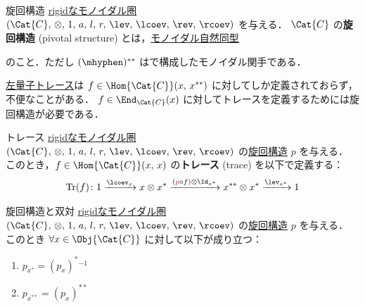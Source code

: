 \documentclass[TQFT_main]{subfiles}
\begin{document}
\begin{mydef}[label=def:pivotal,breakable]{旋回構造}
    \hyperref[redef:rigid]{rigidなモノイダル圏} $(\Cat{C},\, \otimes,\, 1,\, a,\, l,\, r,\, \lev,\, \lcoev,\, \rev,\, \rcoev)$ を与える．
    $\Cat{C}$ の\textbf{旋回構造} (pivotal structure) とは，\hyperref[def:monoidal-nat]{モノイダル自然同型}
    \begin{center}
    \end{center}
    のこと．ただし $(\mhyphen)^{**}$ はで構成したモノイダル関手である．
\end{mydef}

\hyperref[def:qtrace]{左量子トレース}は $f \in \Hom{\Cat{C}}(x,\, x^{**})$ に対してしか定義されておらず，不便なことがある．
$f \in \End_{\Cat{C}} (x)$ に対してトレースを定義するためには旋回構造が必要である．

\begin{mydef}[label=def:trace]{トレース}
    \hyperref[redef:rigid]{rigidなモノイダル圏} $(\Cat{C},\, \otimes,\, 1,\, a,\, l,\, r,\, \lev,\, \lcoev,\, \rev,\, \rcoev)$ の\hyperref[def:pivotal]{旋回構造} $p$ を与える．
    このとき，$f \in \Hom{\Cat{C}}(x,\, x)$ の\textbf{トレース} (trace) を以下で定義する：
    \begin{align}
        \Tr (f) \colon 1 \xrightarrow{\lcoev_x} x \otimes x^* \xrightarrow{(\textcolor{red}{p}\circ f) \otimes \Id_{x^*}} x^{**} \otimes x^* \xrightarrow{\lev_{x^*}} 1
    \end{align}
\end{mydef}

\begin{mylem}[label=lem:pivotal]{旋回構造と双対}
    \hyperref[redef:rigid]{rigidなモノイダル圏} $(\Cat{C},\, \otimes,\, 1,\, a,\, l,\, r,\, \lev,\, \lcoev,\, \rev,\, \rcoev)$ の\hyperref[def:pivotal]{旋回構造} $p$ を与える．
    このとき $\forall x \in \Obj{\Cat{C}}$ に対して以下が成り立つ：
    \begin{enumerate}
        \item $p_{x^*} = (p_x)^{*}{}^{-1}$
        \item $p_{x^{**}} = (p_x)^{**}$
    \end{enumerate}
\end{mylem}
\end{document}
